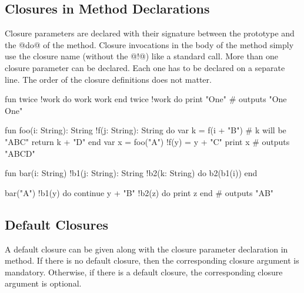 \subsection{Closures in Method Declarations}

Closure parameters are declared with their signature between the prototype and the @do@ of the method.
Closure invocations in the body of the method simply use the closure name (without the @!@) like a standard call.
More than one closure parameter can be declared.
Each one has to be declared on a separate line.
The order of the closure definitions does not matter.

\begin{multicols}{2}
\begin{lst}
fun twice
	!work
do
	work
	work
end
twice !work do print "One"
# outputs "One One"
\end{lst}


\begin{lst}
fun foo(i: String): String
	!f(j: String): String
do
	var k = f(i + "B")
	# k will be "ABC"
	return k + "D"
end
var x = foo("A") !f(y) =
		y + "C"
print x # outputs "ABCD"
\end{lst}
\columnbreak
\begin{lst}
fun bar(i: String)
	!b1(j: String): String
	!b2(k: String)
do
	b2(b1(i))
end

bar("A") !b1(y) do
	continue y + "B"
!b2(z) do
	print z
end
# outputs "AB"
\end{lst}
\end{multicols}

\subsection{Default Closures}

A default closure can be given along with the closure parameter declaration in method.
If there is no default closure, then the corresponding closure argument is mandatory.
Otherwise, if there is a default closure, the corresponding closure argument is optional.


